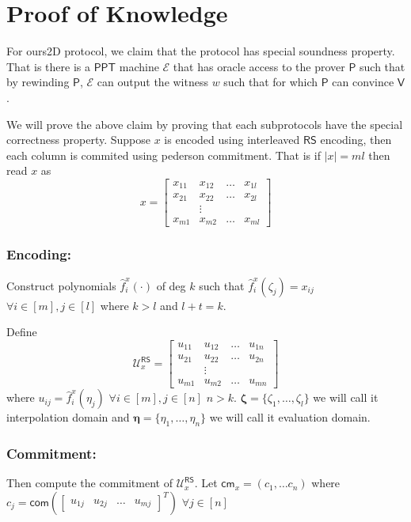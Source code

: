 \documentclass[runningheads]{llncs}
\newcommand{\name}{\textsf{ours}}
\def\ppt{\mathsf{PPT}}
\def\extrac{\mathcal{E}}
\def\prover{\mathsf{P}}
\def\verifier{\mathsf{V}}
\def\RS{\mathsf{RS}} %
\def\cm{\mathsf{cm}} %
\def\com{\mathsf{com}} %
\def\calU{\mathcal{U}}
\begin{document}
\section{Proof of Knowledge}
	For \name2D protocol, we claim that the protocol has special soundness property. That is there is a $\ppt$ machine $\extrac$ that has oracle access to the prover $\prover$ such that by rewinding $\prover$, $\extrac$ can output the witness $w$ such that for which $\prover$ can convince $\verifier$.
	
	We will prove the above claim by proving that each subprotocols have the special correctness property. 
	Suppose $x$ is encoded using interleaved $\RS$ encoding, then each column is commited using pederson commitment. That is if $|x|=ml$ then read $x$ as 
	$$x=
	\begin{bmatrix}
		x_{11} & x_{12} & \ldots & x_{1l}\\
		x_{21} & x_{22} & \ldots & x_{2l}\\
		& \vdots\\
		x_{m1} & x_{m2} & \ldots & x_{ml}
	\end{bmatrix}
	$$	
	\subsubsection{Encoding:} Construct polynomials $\hat{f}^x_i(\cdot)$ of deg $k$ such that $\hat{f}^x_i(\zeta_j)=x_{ij}$ $\forall i\in [m], j\in [l]$ where $k>l$ and $l+t=k$.
	
	Define 
	$$\calU^{\RS}_x =
	\begin{bmatrix}
		u_{11} & u_{12} & \ldots & u_{1n}\\
		u_{21} & u_{22} & \ldots & u_{2n}\\
		& \vdots\\
		u_{m1} & u_{m2} & \ldots & u_{mn}
	\end{bmatrix}
	$$
	where $u_{ij}= \hat{f}^x_i(\eta_j)$ $\forall i\in[m], j\in[n]$ $n>k$. $\bm{\zeta}=\{\zeta_1,\ldots,\zeta_l\}$ we will call it interpolation domain and $\bm{\eta} = \{\eta_1,\ldots,\eta_n\}$ we will call it evaluation domain.
	
	\subsubsection{Commitment:} Then compute the commitment of $\calU^{\RS}_x$. Let $\cm_x=(c_1,\ldots c_n)$ where $c_j= \com( \begin{bmatrix}
	u_{1j} & u_{2j} & \ldots & u_{mj}
	\end{bmatrix}^T)$ $\forall j\in [n]$
\end{document}

